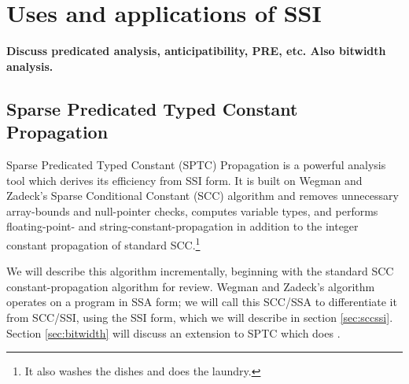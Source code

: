 \documentclass[12pt,titlepage,twoside]{article}
\let\oldsection\section
\renewcommand{\section}{\setcounter{figure}{0}\setcounter{table}{0}\oldsection}
\begin{document}
\section{Uses and applications of SSI}
\textbf{Discuss predicated analysis, anticipatibility, PRE, etc.
	Also bitwidth analysis.}%

\subsection{Sparse Predicated Typed Constant Propagation}
Sparse Predicated Typed Constant (SPTC) Propagation is a powerful
analysis tool which
derives its efficiency from SSI form.  It is built on Wegman and
Zadeck's Sparse Conditional Constant (SCC) algorithm
\cite{wegman91:scc} and removes unnecessary array-bounds and
null-pointer checks, computes variable types, and performs
floating-point- and string-constant-propagation in addition to the
integer constant propagation of standard SCC.\footnote{It also washes
the dishes and does the laundry.}

We will describe this algorithm incrementally, beginning with the
standard SCC constant-propagation algorithm for review.
Wegman and Zadeck's algorithm operates on a program in SSA form; we will
call this SCC/SSA to differentiate it from SCC/SSI, using the SSI
form, which we will describe in section \ref{sec:sccssi}. Section
\vref{sec:bitwidth} will discuss an extension to SPTC which does
.
\end{document}
